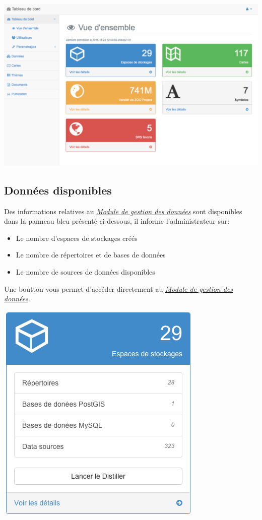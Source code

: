 \documentclass[letterpaper,10pt,french]{sphinxmanual}
\begin{document}
\includegraphics[width=1.000\linewidth]{dashboard-module-preview.png}


\subsection{Données disponibles}
\label{dashboard/overview:donnees-disponibles}
Des informations relatives au {\hyperref[data/index::doc]{\emph{\emph{Module de gestion des données}}}} sont disponibles
dans la panneau bleu présenté ci-dessous, il informe l'administrateur sur:
\begin{itemize}
\item {} 
Le nombre d'espaces de stockages créés

\item {} 
Le nombre de répertoires et de bases de données

\item {} 
Le nombre de sources de données disponibles

\end{itemize}

Une boutton vous permet d'accéder directement au {\hyperref[data/index::doc]{\emph{\emph{Module de gestion des données}}}}.

\includegraphics[width=0.330\linewidth]{dashboard-datastore-block.png}
\end{document}
